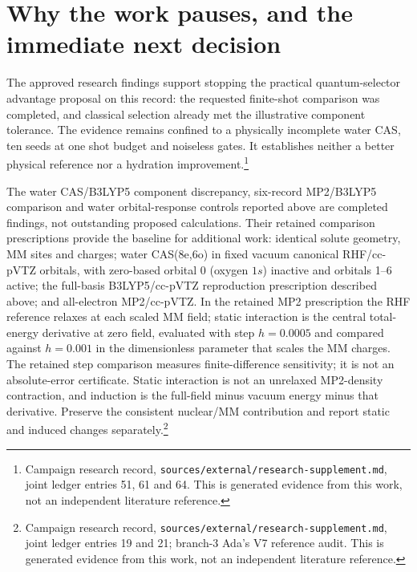 \documentclass{article}
\newcommand{\record}[1]{\footnote{Campaign research record, \texttt{sources/external/research-supplement.md}, #1. This is generated evidence from this work, not an independent literature reference.}}
\begin{document}
\section{Why the work pauses, and the immediate next decision}
The approved research findings support stopping the practical quantum-selector advantage proposal on this record: the requested finite-shot comparison was completed, and classical selection already met the illustrative component tolerance. The evidence remains confined to a physically incomplete water CAS, ten seeds at one shot budget and noiseless gates. It establishes neither a better physical reference nor a hydration improvement.\record{joint ledger entries 51, 61 and 64}

The water CAS/B3LYP5 component discrepancy, six-record MP2/B3LYP5 comparison and water orbital-response controls reported above are completed findings, not outstanding proposed calculations. Their retained comparison prescriptions provide the baseline for additional work: identical solute geometry, MM sites and charges; water CAS(8e,6o) in fixed vacuum canonical RHF/cc-pVTZ orbitals, with zero-based orbital 0 (oxygen \(1s\)) inactive and orbitals 1--6 active; the full-basis B3LYP5/cc-pVTZ reproduction prescription described above; and all-electron MP2/cc-pVTZ. In the retained MP2 prescription the RHF reference relaxes at each scaled MM field; static interaction is the central total-energy derivative at zero field, evaluated with step \(h=0.0005\) and compared against \(h=0.001\) in the dimensionless parameter that scales the MM charges. The retained step comparison measures finite-difference sensitivity; it is not an absolute-error certificate. Static interaction is not an unrelaxed MP2-density contraction, and induction is the full-field minus vacuum energy minus that derivative. Preserve the consistent nuclear/MM contribution and report static and induced changes separately.\record{joint ledger entries 19 and 21; branch-3 Ada's V7 reference audit}
\end{document}
